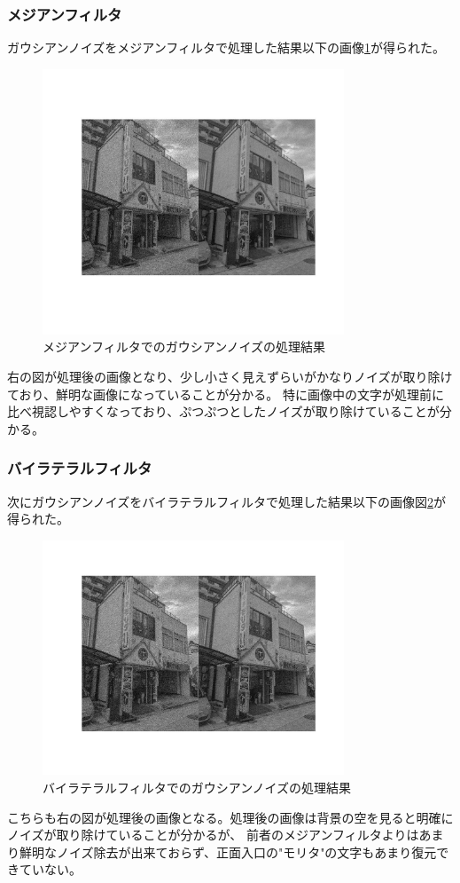 \documentclass[a4paper,11pt,dvipdfmx]{jsarticle}
\begin{document}
\subsubsection{メジアンフィルタ}
ガウシアンノイズをメジアンフィルタで処理した結果以下の画像\ref{gauss_med}が得られた。
\begin{figure}[h]
    \centering
    \includegraphics[width=90mm]{./img/gauss_med.jpg}
    \caption{メジアンフィルタでのガウシアンノイズの処理結果}
    \label{gauss_med}
\end{figure}
右の図が処理後の画像となり、少し小さく見えずらいがかなりノイズが取り除けており、鮮明な画像になっていることが分かる。
特に画像中の文字が処理前に比べ視認しやすくなっており、ぷつぷつとしたノイズが取り除けていることが分かる。

\subsubsection{バイラテラルフィルタ}
次にガウシアンノイズをバイラテラルフィルタで処理した結果以下の画像図\ref{gauss_bil}が得られた。
\begin{figure}[h]
    \centering
    \includegraphics[width=90mm]{./img/gauss_bil.jpg}
    \caption{バイラテラルフィルタでのガウシアンノイズの処理結果}
    \label{gauss_bil}
\end{figure}
こちらも右の図が処理後の画像となる。処理後の画像は背景の空を見ると明確にノイズが取り除けていることが分かるが、
前者のメジアンフィルタよりはあまり鮮明なノイズ除去が出来ておらず、正面入口の"モリタ"の文字もあまり復元できていない。
\end{document}

